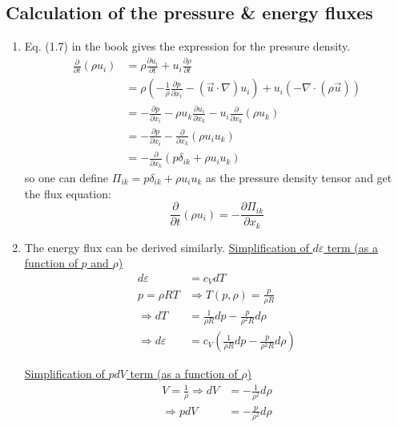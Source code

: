 ﻿\documentclass[11pt]{article}
\begin{document}
\subsection{Calculation of the pressure \& energy fluxes}
  \begin{enumerate}
    \item Eq. (1.7) in the book gives the expression for the pressure density.
    \begin{equation}
    \begin{aligned}
      \frac{\partial}{\partial t} (\rho u_i) &= \rho \frac{\partial u_i}{\partial t} + u_i \frac{\partial \rho}{\partial t} \\ 
      &= \rho\left(-\frac{1}{\rho} \frac{\partial p}{\partial x_i} - (\vec{u} \cdot \nabla) u_i\right) + u_i \left(-\nabla \cdot (\rho \vec{u})\right) \\ 
      &= -\frac{\partial p}{\partial x_i} - \rho u_k \frac{\partial u_i}{\partial x_k} - u_i \frac{\partial}{\partial x_k} (\rho u_k) \\
      &= -\frac{\partial p}{\partial x_i} - \frac{\partial}{\partial x_k} (\rho u_i u_k) \\ 
      &= -\frac{\partial}{\partial x_k} \left( p \delta_{ik} + \rho u_i u_k \right)
    \end{aligned}
    \end{equation}
    so one can define $\Pi_{ik} = p \delta_{ik} + \rho u_i u_k$ as the pressure density tensor and get the flux equation:
    \begin{equation}
      \frac{\partial}{\partial t} (\rho u_i) = -\frac{\partial \Pi_{ik}}{\partial x_k}
    \end{equation}
    \item The energy flux can be derived similarly.
    \underline{Simplification of $d\varepsilon$ term (as a function of $p$ and $\rho$)}
    \begin{align}
      d\varepsilon &= c_V dT \\
      p = \rho R T &\Rightarrow T(p, \rho) = \frac{p}{\rho R} \\
      \Rightarrow dT &= \frac{1}{\rho R} dp - \frac{p}{\rho^2 R} d\rho \\
      \Rightarrow d\varepsilon &= c_V \left( \frac{1}{\rho R} dp - \frac{p}{\rho^2 R} d\rho \right)
    \end{align}

    \underline{Simplification of $p dV$ term (as a function of $\rho$)}
    \begin{align}
      V = \frac{1}{\rho} \Rightarrow dV &= -\frac{1}{\rho^2} d\rho \\
      \Rightarrow p dV &= -\frac{p}{\rho^2} d\rho
    \end{align}


\end{enumerate}
\end{document}
